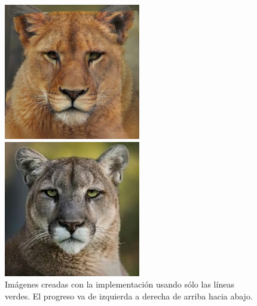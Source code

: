 \documentclass[conference]{IEEEtran}
\begin{document}
\begin{figure}[H]
\begin{multicols}{3}
    \includegraphics[width=1.0\linewidth]{TestsCats/G/img20.png} \par
    \includegraphics[width=1.0\linewidth]{TestsCats/G/img50.png} \par
\end{multicols}
\caption{Imágenes creadas con la implementación usando sólo las líneas verdes. El progreso va de izquierda a derecha de arriba hacia abajo.}
\end{figure}
\end{document}
